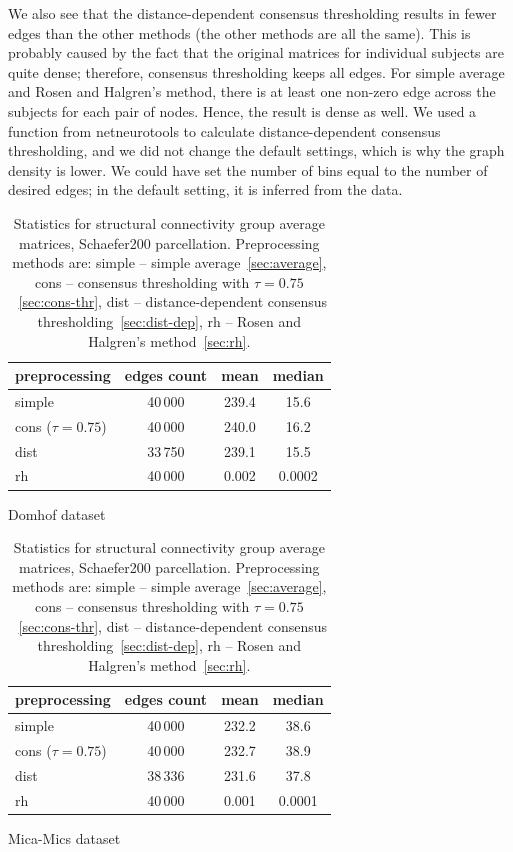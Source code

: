 We also see that the distance-dependent consensus thresholding results in fewer edges than the other methods (the other methods are all the same). This is probably caused by the fact that the original matrices for individual subjects are quite dense; therefore, consensus thresholding keeps all edges. For simple average and Rosen and Halgren's method, there is at least one non-zero edge across the subjects for each pair of nodes. Hence, the result is dense as well. We used a function from netneurotools to calculate distance-dependent consensus thresholding, and we did not change the default settings, which is why the graph density is lower. We could have set the number of bins equal to the number of desired edges; in the default setting, it is inferred from the data.

\begin{table}[h!]
\begin{subtable}{\textwidth}
    \centering
    \begin{tabular}{l | c | c | c }
        preprocessing & edges count & mean	& median\\
        \midrule
        simple             &40\,000  &239.4  &15.6	\\
        cons ($\tau=0.75$) &40\,000	&240.0	&16.2	\\
        dist               &33\,750	&239.1	&15.5	\\
        rh                 &40\,000	&0.002	&0.0002 \\
    \end{tabular}
    \caption{Domhof dataset}
    \label{tab:sc_stats_domhof}
\end{subtable}

\bigskip

\begin{subtable}{\textwidth}
    \centering
    \begin{tabular}{l | c | c | c }
        preprocessing & edges count & mean	& median\\
        \midrule
        simple             &40\,000  &232.2	&38.6	\\
        cons ($\tau=0.75$) &40\,000	&232.7	&38.9	\\
        dist               &38\,336	&231.6	&37.8	\\
        rh                 &40\,000	&0.001	&0.0001 \\
    \end{tabular}
    \caption{Mica-Mics dataset}
    \label{tab:sc_stats_mica}
\end{subtable}
    \caption[Statistics for structural connectivity group average matrices]{Statistics for structural connectivity group average matrices, Schaefer200 parcellation. Preprocessing methods are: simple -- simple average~\ref{sec:average}, cons -- consensus thresholding with $\tau=0.75$~\ref{sec:cons-thr}, dist -- distance-dependent consensus thresholding~\ref{sec:dist-dep}, rh -- Rosen and Halgren's method~\ref{sec:rh}. }
    \label{tab:sc_stats}
\end{table}

